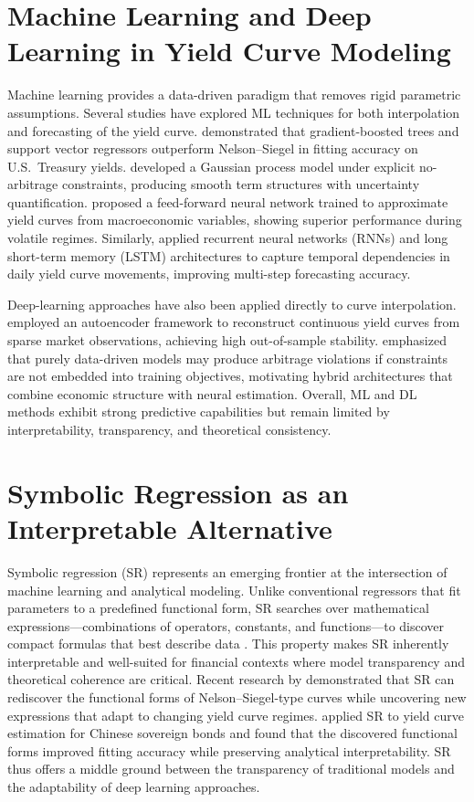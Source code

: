\documentclass[12pt]{report}
\begin{document}
\section{Machine Learning and Deep Learning in Yield Curve Modeling}

Machine learning provides a data-driven paradigm that removes rigid parametric assumptions.  
Several studies have explored ML techniques for both interpolation and forecasting of the yield curve.  
\textcite{Chen2019} demonstrated that gradient-boosted trees and support vector regressors outperform Nelson–Siegel in fitting accuracy on U.S.~Treasury yields.  
\textcite{Lim2023} developed a Gaussian process model under explicit no-arbitrage constraints, producing smooth term structures with uncertainty quantification.  
\textcite{Heaton2020} proposed a feed-forward neural network trained to approximate yield curves from macroeconomic variables, showing superior performance during volatile regimes.  
Similarly, \textcite{Cao2021} applied recurrent neural networks (RNNs) and long short-term memory (LSTM) architectures to capture temporal dependencies in daily yield curve movements, improving multi-step forecasting accuracy.  

Deep-learning approaches have also been applied directly to curve interpolation.  
\textcite{Jeong2022} employed an autoencoder framework to reconstruct continuous yield curves from sparse market observations, achieving high out-of-sample stability.  
\textcite{MuhleKarbe2019} emphasized that purely data-driven models may produce arbitrage violations if constraints are not embedded into training objectives, motivating hybrid architectures that combine economic structure with neural estimation.  
Overall, ML and DL methods exhibit strong predictive capabilities but remain limited by interpretability, transparency, and theoretical consistency.

\section{Symbolic Regression as an Interpretable Alternative}

Symbolic regression (SR) represents an emerging frontier at the intersection of machine learning and analytical modeling.  
Unlike conventional regressors that fit parameters to a predefined functional form, SR searches over mathematical expressions—combinations of operators, constants, and functions—to discover compact formulas that best describe data \parencite{SchmidtLipson2009,UdrescuTegmark2020}.  
This property makes SR inherently interpretable and well-suited for financial contexts where model transparency and theoretical coherence are critical.  
Recent research by \textcite{Cornelissen2023} demonstrated that SR can rediscover the functional forms of Nelson–Siegel-type curves while uncovering new expressions that adapt to changing yield curve regimes.  
\textcite{Chen2022} applied SR to yield curve estimation for Chinese sovereign bonds and found that the discovered functional forms improved fitting accuracy while preserving analytical interpretability.  
SR thus offers a middle ground between the transparency of traditional models and the adaptability of deep learning approaches.
\end{document}
